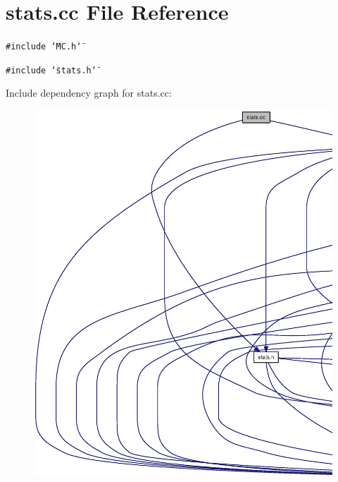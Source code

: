 \section{stats.cc File Reference}
\label{stats_8cc}
{\tt \#include \char`\"{}MC.h\char`\"{}}\par
{\tt \#include \char`\"{}stats.h\char`\"{}}\par


Include dependency graph for stats.cc:\nopagebreak
\begin{figure}[H]
\begin{center}
\leavevmode
\includegraphics[width=420pt]{stats_8cc__incl}
\end{center}
\end{figure}
